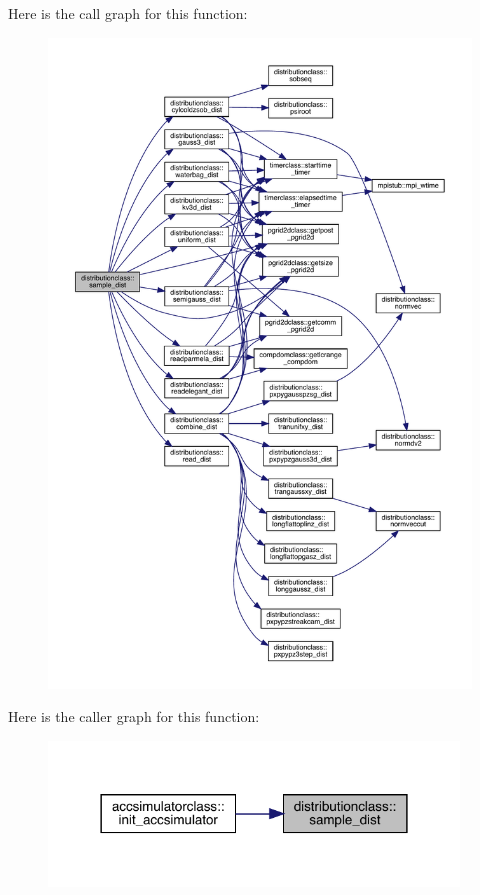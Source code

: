 Here is the call graph for this function\+:\nopagebreak
\begin{figure}[H]
\begin{center}
\leavevmode
\includegraphics[width=350pt]{namespacedistributionclass_aee8dd99a29887ed3860bcce7adb87ce8_cgraph}
\end{center}
\end{figure}
Here is the caller graph for this function\+:\nopagebreak
\begin{figure}[H]
\begin{center}
\leavevmode
\includegraphics[width=309pt]{namespacedistributionclass_aee8dd99a29887ed3860bcce7adb87ce8_icgraph}
\end{center}
\end{figure}
\mbox{\label{namespacedistributionclass_a5ae8e13c52291510b7b0b6fe333db73f}} 
